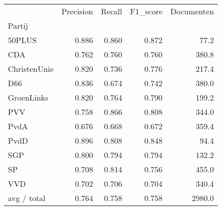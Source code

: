 \begin{tabular}{lrrrr}
\toprule
{} &  Precision &  Recall &  F1\_score &  Documenten \\
Partij       &            &         &           &             \\
\midrule
50PLUS       &      0.886 &   0.860 &     0.872 &        77.2 \\
   CDA       &      0.762 &   0.760 &     0.760 &       380.8 \\
ChristenUnie &      0.820 &   0.736 &     0.776 &       217.4 \\
   D66       &      0.836 &   0.674 &     0.742 &       380.0 \\
  GroenLinks &      0.820 &   0.764 &     0.790 &       199.2 \\
   PVV       &      0.758 &   0.866 &     0.808 &       344.0 \\
  PvdA       &      0.676 &   0.668 &     0.672 &       359.4 \\
  PvdD       &      0.896 &   0.808 &     0.848 &        94.4 \\
   SGP       &      0.800 &   0.794 &     0.794 &       132.2 \\
    SP       &      0.708 &   0.814 &     0.756 &       455.0 \\
   VVD       &      0.702 &   0.706 &     0.704 &       340.4 \\
 avg / total &      0.764 &   0.758 &     0.758 &      2980.0 \\
\bottomrule
\end{tabular}
